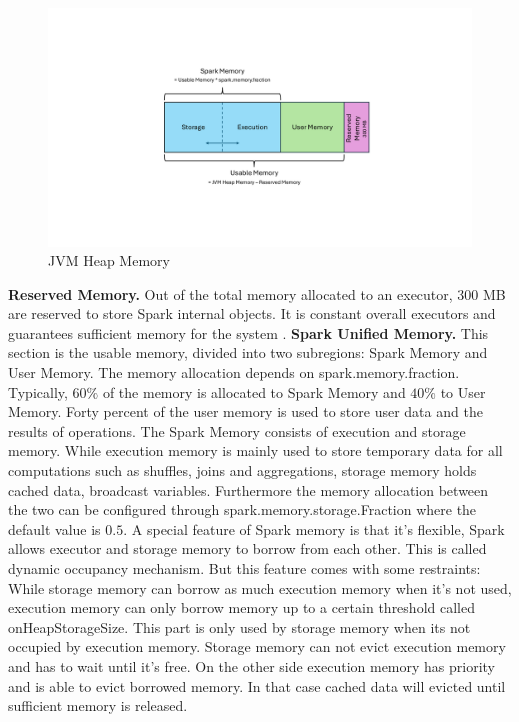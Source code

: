 \begin{figure}[ht]
    \centering
    \includegraphics[width=0.7\linewidth]{images/Spark_mem_man.pdf}
    \caption{JVM Heap Memory}
    \label{fig:spark-mem-man}
\end{figure}

\textbf{Reserved Memory.} Out of the total memory allocated to an executor, 300 MB are reserved to store Spark internal objects. It is constant overall executors and guarantees sufficient memory for the system \cite{apache_spark_configuration_2025}.
\textbf{Spark Unified Memory.} This section is the usable memory, divided into two subregions: Spark Memory and User Memory. The memory allocation depends on spark.memory.fraction. Typically, $60\%$ of the memory is allocated to Spark Memory and $40\%$ to User Memory. Forty percent of the user memory is used to store user data and the results of operations. The Spark Memory consists of execution and storage memory. While execution memory is mainly used to store temporary data for all computations such as shuffles, joins and aggregations, storage memory holds cached data, broadcast variables. Furthermore the memory allocation between the two can be configured through spark.memory.storage.Fraction where the default value is $0.5$. A special feature of Spark memory is that it's flexible, Spark allows executor and storage memory to borrow from each other. This is called dynamic occupancy mechanism. But this feature comes with some restraints: While storage memory can borrow as much execution memory when it's not used, execution memory can only borrow memory up to a certain threshold called onHeapStorageSize. This part is only used by storage memory when its not occupied by execution memory. Storage memory can not evict execution memory and has to wait until it's free. On the other side execution memory has priority and is able to evict borrowed memory. In that case cached data will evicted until sufficient memory is released. 



